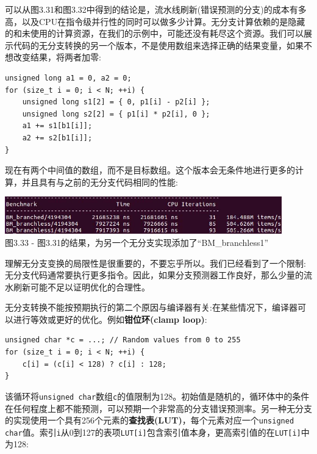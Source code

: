 可以从图3.31和图3.32中得到的结论是，流水线刷新(错误预测的分支)的成本有多高，以及CPU在指令级并行性的同时可以做多少计算。无分支计算依赖的是隐藏的和未使用的计算资源，在我们的示例中，可能还没有耗尽这个资源。我们可以展示代码的无分支转换的另一个版本，不是使用数组来选择正确的结果变量，如果不想改变结果，将两者加零:

\begin{lstlisting}[style=styleCXX]
unsigned long a1 = 0, a2 = 0;
for (size_t i = 0; i < N; ++i) {
	unsigned long s1[2] = { 0, p1[i] - p2[i] };
	unsigned long s2[2] = { p1[i] * p2[i], 0 };
	a1 += s1[b1[i]];
	a2 += s2[b1[i]];
}
\end{lstlisting}

现在有两个中间值的数组，而不是目标数组。这个版本会无条件地进行更多的计算，并且具有与之前的无分支代码相同的性能:

\begin{center}
\includegraphics[width=0.9\textwidth]{content/1/chapter3/images/33.jpg}\\
图3.33 - 图3.31的结果，为另一个无分支实现添加了“BM\_branchless1”
\end{center}

理解无分支变换的局限性是很重要的，不要忘乎所以。我们已经看到了一个限制:无分支代码通常要执行更多指令。因此，如果分支预测器工作良好，那么少量的流水刷新可能不足以证明优化的合理性。

无分支转换不能按预期执行的第二个原因与编译器有关:在某些情况下，编译器可以进行等效或更好的优化。例如\textbf{钳位环(clamp loop)}:

\begin{lstlisting}[style=styleCXX]
unsigned char *c = ...; // Random values from 0 to 255
for (size_t i = 0; i < N; ++i) {
	c[i] = (c[i] < 128) ? c[i] : 128;
}
\end{lstlisting}

该循环将\texttt{unsigned char}数组\texttt{c}的值限制为128。初始值是随机的，循环体中的条件在任何程度上都不能预测，可以预期一个非常高的分支错误预测率。另一种无分支的实现使用一个具有256个元素的\textbf{查找表(LUT)}，每个元素对应一个\texttt{unsigned char}值。索引\texttt{i}从0到127的表项\texttt{LUT[i]}包含索引值本身，更高索引值的在\texttt{LUT[i]}中为128:

